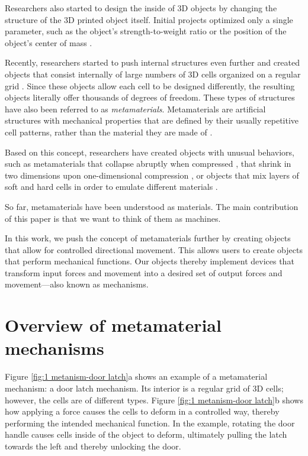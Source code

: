 Researchers also started to design the inside of 3D objects by changing the structure of the 3D printed object itself. Initial projects optimized only a single parameter, such as the object’s strength-to-weight ratio \cite{Lu2014} or the position of the object’s center of mass \cite{Prevost2013}. 

Recently, researchers started to push internal structures even further and created objects that consist internally of large numbers of 3D cells organized on a regular grid \cite{Schumacher2015}. Since these objects allow each cell to be designed differently, the resulting objects literally offer thousands of degrees of freedom. These types of structures have also been referred to as \textit{metamaterials}. Metamaterials are artificial structures with mechanical properties that are defined by their usually repetitive cell patterns, rather than the material they are made of \cite{Paulose2015}. 

Based on this concept, researchers have created objects with unusual behaviors, such as metamaterials that collapse abruptly when compressed \cite{Mullin2007}, that shrink in two dimensions upon one-dimensional compression \cite{AlvarezElipe2012}, or objects that mix layers of soft and hard cells in order to emulate different materials \cite{Bickel2010a}. 

So far, metamaterials have been understood as materials. The main contribution of this paper is that we want to think of them as machines. 

In this work, we push the concept of metamaterials further by creating objects that allow for controlled directional movement. This allows users to create objects that perform mechanical functions. Our objects thereby implement devices that transform input forces and movement into a desired set of output forces and movement---also known as mechanisms. 


\section{Overview of metamaterial mechanisms}

Figure \ref{fig:1 metanism-door latch}a shows an example of a metamaterial mechanism: a door latch mechanism. Its interior is a regular grid of 3D cells; however, the cells are of different types. Figure \ref{fig:1 metanism-door latch}b shows how applying a force causes the cells to deform in a controlled way, thereby performing the intended mechanical function. In the example, rotating the door handle causes cells inside of the object to deform, ultimately pulling the latch towards the left and thereby unlocking the door.

